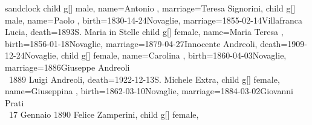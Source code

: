 \documentclass{article}
\begin{document}
\begin{midpage}
\begin{center}

\begin{genealogypicture}[
    processing=database,
    database format=full,
    timeflow=right,
    node size=1.7cm,
    level size=3.5cm,
    level distance=6mm,
    list separators hang=3mm,
    name font=\bfseries,
    surn code={\textcolor{black!50!black}{#1}},
    place text={\newline}{},
    date format=d month yyyy,
    tcbset={male/.style={colframe=blue,colback=blue!5},
    female/.style={colframe=red,colback=red!5}},
    box={fit basedim=7pt,boxsep=2pt,segmentation style=solid,
        halign=left,before upper=\parskip1pt,
        \gtrDBsex,
    },
]
sandclock
{
    child{
        g[]{
            male,
            name={Antonio },
            marriage={Teresa Signorini}{},
        }
        child{
            g[]{
                male,
                name={Paolo },
                birth={1830-14-24}{Novaglie},
                marriage={1855-02-14}{Villafranca Lucia},
                death={1893}{S. Maria in Stelle}
            }
            child{
                g[]{
                    female,
                    name={Maria Teresa },
                    birth={1856-01-18}{Novaglie},
                    marriage={1879-04-27}{Innocente Andreoli},
                    death={1909-12-24}{Novaglie},
                }
            }
            child{
                g[]{
                    female,
                    name={Carolina },
                    birth={1860-04-03}{Novaglie},
                    marriage={1886}{Giuseppe Andreoli \\ \gtrsymMarried~1889 \newline \hspace*{3mm} Luigi Andreoli},
                    death={1922-12-13}{S. Michele Extra},
                }
            }
            child{
                g[]{
                    female,
                    name={Giuseppina },
                    birth={1862-03-10}{Novaglie},
                    marriage={1884-03-02}{Giovanni Prati \\ \gtrsymMarried~17 Gennaio 1890 \newline \hspace*{3mm} Felice Zamperini},
                }
            }
            child{
                g[]{
                    female,
}}}}}
\end{genealogypicture}
\end{center}
\end{midpage}
\end{document}
